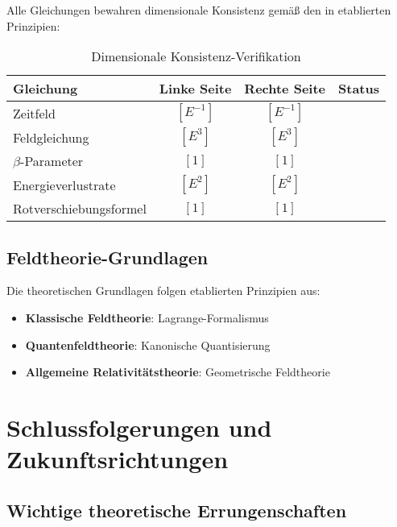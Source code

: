\documentclass[12pt,a4paper]{article}
\begin{document}
	Alle Gleichungen bewahren dimensionale Konsistenz gemäß den in \citep{barenblatt1996,bridgman1922} etablierten Prinzipien:
	
	\begin{table}[htbp]
		\centering
		\begin{tabular}{lccl}
			\toprule
			\textbf{Gleichung} & \textbf{Linke Seite} & \textbf{Rechte Seite} & \textbf{Status} \\
			\midrule
			Zeitfeld & $[E^{-1}]$ & $[E^{-1}]$ & \checkmark \\
			Feldgleichung & $[E^3]$ & $[E^3]$ & \checkmark \\
			$\beta$-Parameter & $[1]$ & $[1]$ & \checkmark \\
			Energieverlustrate & $[E^2]$ & $[E^2]$ & \checkmark \\
			Rotverschiebungsformel & $[1]$ & $[1]$ & \checkmark \\
			\bottomrule
		\end{tabular}
		\caption{Dimensionale Konsistenz-Verifikation}
		\label{tab:dimensional_check}
	\end{table}
	
	\subsection{Feldtheorie-Grundlagen}
	\label{subsec:field_theory_foundations}
	
	Die theoretischen Grundlagen folgen etablierten Prinzipien aus:
	\begin{itemize}
		\item \textbf{Klassische Feldtheorie}: Lagrange-Formalismus \citep{goldstein2001,landau1975}
		\item \textbf{Quantenfeldtheorie}: Kanonische Quantisierung \citep{peskin1995,weinberg1995}
		\item \textbf{Allgemeine Relativitätstheorie}: Geometrische Feldtheorie \citep{misner1973,carroll2004}
	\end{itemize}
	
	\section{Schlussfolgerungen und Zukunftsrichtungen}
	\label{sec:conclusions}
	
	\subsection{Wichtige theoretische Errungenschaften}
	\label{subsec:key_achievements}
	
\end{document}

